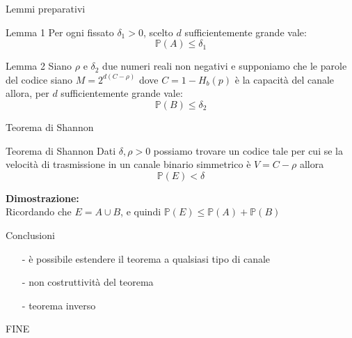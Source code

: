 \documentclass{beamer}
\theoremstyle{definition}
\numberwithin{equation}{section}
\begin{document}
\begin{frame}[t]{Lemmi preparativi} \vspace{5pt}
\begin{block}{Lemma 1}
Per ogni fissato $\delta_1>0$, scelto $d$ sufficientemente grande vale:
$$\mathbb{P}(A)\leq \delta_1$$   
\end{block}
\vspace{20pt}
\begin{block}{Lemma 2}
Siano $\rho$ e $\delta_2$ due numeri reali non negativi e supponiamo che le parole del codice siano $M=2^{d(C-\rho)}$ dove $C=1-H_b(p)$ è la capacità del canale allora, per $d$ sufficientemente grande vale:
$$\mathbb{P}(B)\leq \delta_2$$
\end{block}
\end{frame}


\begin{frame}[t]{Teorema di Shannon} \vspace{30pt}
\begin{block}{Teorema di Shannon}
\vspace{0.5em}
Dati $\delta , \rho > 0$ possiamo trovare un codice tale per cui se la velocità di trasmissione in un canale binario simmetrico è $V=C-\rho$ allora
$$\mathbb{P}(E)< \delta$$
\vspace{0.5em}
\end{block}
\large\textbf{Dimostrazione:}\\
Ricordando che $E=A\cup B$, e quindi $\mathbb{P}(E) \leq \mathbb{P}(A)+ \mathbb{P}(B)$
\end{frame}


\begin{frame}[t]{Conclusioni} \vspace{5pt}
\vspace{40pt}
\begin{enumerate}
\item[-]è possibile estendere il teorema a qualsiasi tipo di canale
\item[-]non costruttività del teorema
\item[-]teorema inverso
\end{enumerate}
\end{frame}


\begin{frame}[t]{FINE} \vspace{45pt}
\end{frame}
\end{document}
